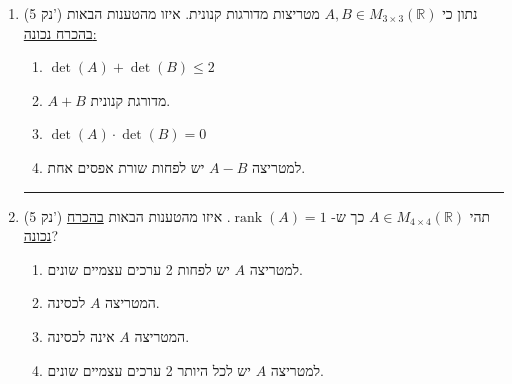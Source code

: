 \documentclass[12pt, a4paper]{article}
\newcommand{\rr}{\mathbb{R}}
\DeclareMathOperator{\rank}{rank}
\newcommand{\points}[1]{(#1 נק') }
\begin{document}
\begin{enumerate}
\noindent\rule{16cm}{0.4pt}
\item\points{5}
נתון כי
$A,B\in M_{3\times 3}(\rr)$
מטריצות מדורגות קנונית.
איזו מהטענות הבאות 
\underline{בהכרח נכונה:}
\begin{enumerate}
\item
$\det(A)+\det(B)\le 2$
\item
$A+B$
מדורגת קנונית.
\item
$\det(A)\cdot \det(B)=0$
\item
למטריצה
$A-B$
יש לפחות שורת אפסים אחת.
\end{enumerate}

\noindent\rule{16cm}{0.4pt}


\item\points{5}
תהי 
$A\in M_{4\times 4}(\rr)$
כך ש-
$\rank(A)=1$. איזו מהטענות הבאות 
\underline{בהכרח נכונה}?
\begin{enumerate}
    \item למטריצה $A$
    יש 
    לפחות
    2 ערכים עצמיים שונים.
    \item המטריצה $A$ לכסינה.
        \item המטריצה $A$ אינה לכסינה.
         \item למטריצה $A$ יש לכל היותר 2 ערכים עצמיים שונים.
\end{enumerate}


\pagebreak

\end{enumerate}

 \pagebreak
\end{document}
